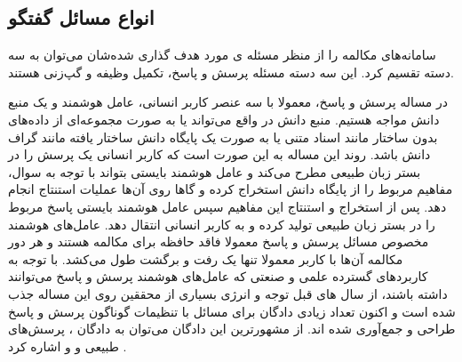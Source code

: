 \subsection{‌انواع مسائل گفتگو}

سامانه‌های مکالمه را از منظر مسئله‌ ی مورد هدف گذاری شده‌شان می‌توان به سه دسته تقسیم کرد. این سه دسته مسئله پرسش و پاسخ، تکمیل وظیفه و گپ‌زنی 
هستند.

در مساله پرسش و پاسخ، معمولا با سه عنصر کاربر انسانی، عامل هوشمند و یک منبع دانش مواجه هستیم. منبع دانش در واقع می‌تواند یا به صورت مجموعه‌ای از داده‌های بدون ساختار مانند اسناد متنی یا به صورت یک پایگاه دانش ساختار یافته مانند گراف دانش باشد. روند این مساله به این صورت است که کاربر انسانی یک پرسش را در بستر زبان طبیعی مطرح می‌کند و عامل هوشمند بایستی بتواند با توجه به سوال، مفاهیم مربوط را از پایگاه دانش استخراج کرده و گاها روی آن‌ها عملیات استنتاج انجام دهد. پس از استخراج و استنتاج این مفاهیم سپس عامل هوشمند بایستی پاسخ مربوط را در بستر زبان طبیعی تولید کرده و به کاربر انسانی انتقال دهد.
عامل‌های هوشمند مخصوص مسائل پرسش و پاسخ معمولا فاقد حافظه برای مکالمه هستند و هر دور مکالمه آن‌ها با کاربر معمولا تنها یک رفت و برگشت طول می‌کشد. با توجه به کاربرد‌های گسترده علمی و صنعتی که عامل‌های هوشمند پرسش و پاسخ می‌توانند داشته باشند، از سال های قبل توجه و انرژی بسیاری از محققین روی این مساله جذب شده است و اکنون تعداد زیادی دادگان برای مسائل با تنظیمات گوناگون پرسش و پاسخ طراحی و جمع‌آوری شده اند. از مشهورترین این دادگان می‌توان به دادگان 
، پرسش‌های طبیعی و 
  و 
   اشاره کرد
\cite{squad_paper, cnnqa_paper, naturalqa_paper, wikiqa_paper}.



